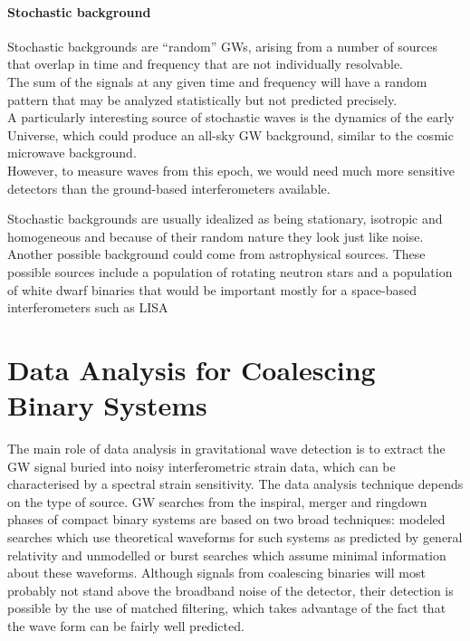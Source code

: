 \documentclass[binding=0.6cm, LaM]{sapthesis}
\begin{document}
\subsubsection{Stochastic background}

	Stochastic backgrounds are “random” GWs, 
	arising from a  number of sources that overlap 
	in time and frequency that are not individually resolvable. \\

	The sum of the signals at any given time and frequency will have 
	a random pattern that may be analyzed statistically but not predicted precisely. \\
	A particularly interesting source of stochastic waves is the dynamics of the early Universe, 
	which could produce an all-sky GW background, 
	similar to the cosmic microwave background. \\
	However, to measure waves from this epoch, 
	we would need much more sensitive detectors than the ground-based interferometers available.
	
	Stochastic backgrounds are usually idealized as being stationary, 
	isotropic and homogeneous and because of their random nature they look just like noise.	\\
	Another possible background could come from astrophysical sources. 
	These possible sources include a population of rotating neutron stars 
	and a population of white dwarf binaries that would be important mostly for a space-based interferometers such as LISA 

\chapter{Data Analysis for Coalescing Binary Systems}

	The main role of data analysis in gravitational wave detection is to extract the GW signal 
	buried into noisy interferometric strain data, which can be characterised by a spectral strain sensitivity.
	The data analysis technique depends on the type of source.
	GW searches from the inspiral, merger and ringdown phases of compact binary systems 
	are based on two broad techniques: 
	modeled searches which use theoretical waveforms for such systems 
	as predicted by general relativity and 
	unmodelled or burst searches which assume minimal information about these waveforms. \cite[p. 2] {bar}
	Although signals from coalescing binaries will most probably not stand above the broadband noise of the detector, 
	their detection is possible by the use of matched filtering, 
	which takes advantage of the fact that the wave form can be fairly well predicted. 
\end{document}

